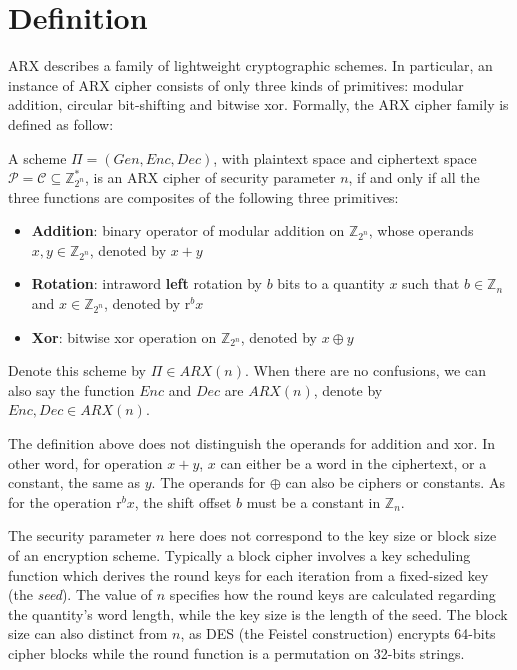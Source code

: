 \section{Definition}
\label{sec:definition}

ARX describes a family of lightweight cryptographic schemes. In particular, an
instance of ARX cipher consists of only three kinds of primitives: modular addition,
circular bit-shifting and bitwise xor. Formally, the ARX cipher family is defined
as follow:

\begin{definition}
A scheme $\Pi=(\mathit{Gen},\mathit{Enc},\mathit{Dec})$, with plaintext
space and ciphertext space $\mathcal{P}=\mathcal{C}\subseteq\mathbb{Z}_{2^n}^*$, is an
ARX cipher of security parameter $n$, if and only if all the three functions are
composites of the following three primitives:
\begin{itemize}
\setlength\partopsep{0em}
\setlength\topsep{0em}
\setlength\itemsep{0em}
\setlength\parskip{0em}
\item {\bf Addition}: binary operator of modular addition on $\mathbb{Z}_{2^n}$,
whose operands $x,y\in\mathbb{Z}_{2^n}$, denoted by $x+y$
\item {\bf Rotation}: intraword \textbf{left} rotation by $b$ bits to a quantity $x$
such that $b\in\mathbb{Z}_n$ and $x\in\mathbb{Z}_{2^n}$, denoted by $\mathrm{r}^bx$
\item {\bf Xor}: bitwise xor operation on $\mathbb{Z}_{2^n}$, denoted by $x\oplus y$
\end{itemize}
Denote this scheme by $\Pi\in\textit{ARX}(n)$. When there are no confusions, we can
also say the function $\mathit{Enc}$ and $\mathit{Dec}$ are $\textit{ARX}(n)$, denote
by $\mathit{Enc},\mathit{Dec}\in\textit{ARX}(n)$.
\end{definition}

The definition above does not distinguish the operands for addition and xor. In other
word, for operation $x+y$, $x$ can either be a word in the ciphertext, or a constant,
the same as $y$. The operands for $\oplus$ can also be ciphers or constants. As for
the operation $\mathrm{r}^bx$, the shift offset $b$ must be a constant in $\mathbb{Z}_n$.

The security parameter $n$ here does not correspond to the key size or block size of
an encryption scheme. Typically a block cipher involves a key scheduling function
which derives the round keys for each iteration from a fixed-sized key (the
\textit{seed}). The value of $n$ specifies how the round keys are calculated regarding
the quantity's word length, while the key size is the length of the seed. The block
size can also distinct from $n$, as DES (the Feistel construction) encrypts 64-bits
cipher blocks while the round function is a permutation on 32-bits strings.

